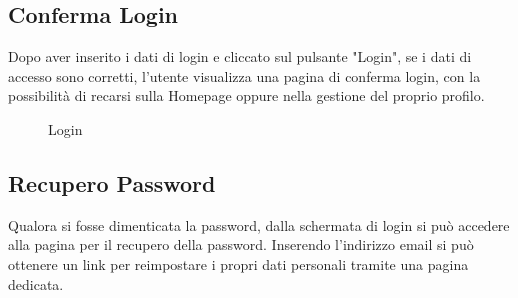 	\subsection{Conferma Login}
	Dopo aver inserito i dati di login e cliccato sul pulsante "Login", se i dati di accesso sono corretti, l'utente visualizza una pagina di conferma login, con la possibilità di recarsi sulla Homepage oppure nella gestione del proprio profilo.
	
	\label{Conferma Login}
	\begin{figure}[H]
		\centering
		\caption{Login}
	\end{figure}
	
	
	
	\subsection{Recupero Password}
	Qualora si fosse dimenticata la password, dalla schermata di login si può accedere alla pagina per il recupero della password. Inserendo l'indirizzo email si può ottenere un link per reimpostare i propri dati personali tramite una pagina dedicata. 
	
